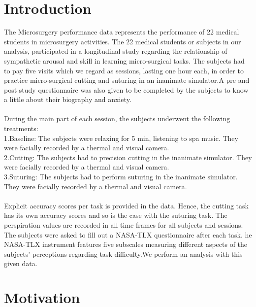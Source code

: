 \documentclass[12pt,epsf]{report}
\begin{document}
\section*{Introduction}
{The Microsurgery performance data represents the performance of 22 medical students in microsurgery activities. The 22 medical students or subjects in our analysis, participated in a longitudinal study regarding the relationship of sympathetic arousal and skill in learning micro-surgical tasks. The subjects had to pay five visits which we regard as sessions, lasting one hour each, in order to practice micro-surgical cutting and suturing in an inanimate simulator.A pre and post study questionnaire was also given to be completed by the subjects to know a little about their biography and anxiety.\\
\\
During the main part of each session, the subjects underwent the following treatments:\\
1.Baseline: The subjects were relaxing for 5 min, listening to spa music. They were facially recorded by a thermal and visual camera.\\
2.Cutting: The subjects had to precision cutting in the inanimate simulator. They were facially recorded by a thermal and visual camera.\\
3.Suturing: The subjects had to perform suturing in the inanimate simulator. They were facially recorded by a thermal and visual camera.\\
\\
Explicit accuracy scores per task is provided in the data. Hence, the cutting task has its own accuracy scores and so is the case with the suturing task. The perspiration values are recorded in all time frames for all subjects and sessions. The subjects were asked to fill out a  NASA-TLX questionnaire after each task. he NASA-TLX instrument features five subscales measuring different aspects of the subjects' perceptions regarding task difficulty.We perform an analysis with this given data.\\   }

\section*{Motivation}
\end{document}
